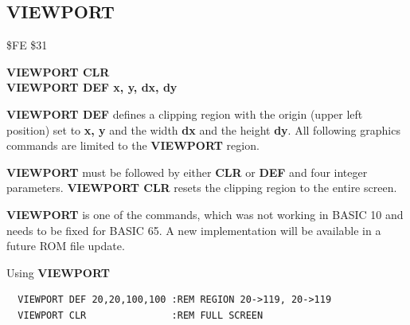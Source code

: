 \subsection{VIEWPORT}
\begin{description}[leftmargin=2cm,style=nextline]
\item [Token:] \$FE \$31
\item [Format:] {\bf VIEWPORT CLR} \\
		{\bf VIEWPORT DEF x, y, dx, dy}
\item [Usage:] {\bf VIEWPORT DEF} defines a clipping region with the origin
               (upper left position) set to {\bf x, y} and the width {\bf dx}
               and the height {\bf dy}.
               All following graphics commands are limited to the {\bf VIEWPORT}
               region.

\item [Remarks:] {\bf VIEWPORT} must be followed by either {\bf CLR} or
                 {\bf DEF} and four integer parameters.
                 {\bf VIEWPORT CLR} resets the clipping region to the entire screen.

\item [Info:] {\bf VIEWPORT} is one of the commands, which was not
              working in BASIC 10 and needs to be fixed for BASIC 65.
              A new implementation will be available in a future ROM file update.

\item [Example:] Using {\bf VIEWPORT}
\begin{tcolorbox}[colback=black,coltext=white]
\verbatimfont{\codefont}
\begin{verbatim}
  VIEWPORT DEF 20,20,100,100 :REM REGION 20->119, 20->119
  VIEWPORT CLR               :REM FULL SCREEN
\end{verbatim}
\end{tcolorbox}
\end{description}


\newpage
